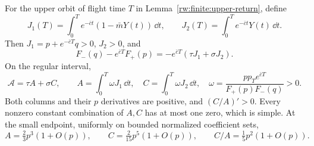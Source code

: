 \begin{lemma}\label{rw:regular-columns}
For the upper orbit of flight time $T$ in
Lemma~\ref{rw:finite:upper-return}, define
\[
 J_1(T)=\int_0^T e^{-\bar ct}(1-\bar mY(t))\,\dd t,
 \qquad J_2(T)=\int_0^T e^{-\bar ct}Y(t)\,\dd t.
\]
Then $J_1=p+e^{-\bar cT}q>0$, $J_2>0$, and
\begin{equation}\label{rw:finite:quasi-invariant}
 F_-(q)-e^{\bar cT}F_+(p)
       =-e^{\bar cT}(\tau J_1+\sigma J_2).
\end{equation}
On the regular interval,
\begin{equation}\label{rw:finite:action-columns}
 \mathcal A=\tau A+\sigma C,\qquad
 A=\int_0^T\omega J_1\,\dd t,
 \quad C=\int_0^T\omega J_2\,\dd t,
 \quad \omega=\frac{p p_Te^{\bar cT}}{F_+(p)F_-(q)}>0.
\end{equation}
Both columns and their $p$ derivatives are positive, and
$(C/A)'>0$. Every nonzero constant combination of $A,C$ has at
most one zero, which is simple. At the small endpoint, uniformly
on bounded normalized coefficient sets,
\begin{equation}\label{rw:finite:small-columns}
 A=\tfrac23p^3(1+O(p)),\qquad
 C=\tfrac2{15}p^5(1+O(p)),\qquad C/A=\tfrac15p^2(1+O(p)).
\end{equation}
\end{lemma}
